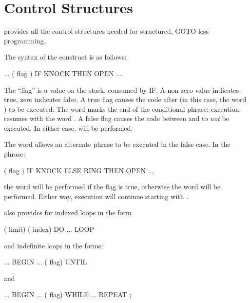 \section{Control Structures}
\Forth{} provides all the control structures%
needed for structured, GOTO-less programming.

The syntax of the  construct is as follows:
\begin{Code}
... ( flag ) IF  KNOCK  THEN  OPEN ...
\end{Code}
The ``flag'' is a value on the stack, consumed by IF. A
non-zero value indicates true, zero indicates false.  A true flag causes
the code after  (in this case, the word ) to be
executed.  The word  marks the end of the conditional phrase;
execution resumes with the word .  A false flag causes the
code between  and  to {\em not} be executed.  In
either case,  will be performed.

The word  allows an alternate phrase to be
executed in the false case. In the phrase:
\begin{Code}
( flag ) IF KNOCK  ELSE  RING  THEN  OPEN ...
\end{Code}
the word  will be performed if the flag is true, otherwise
the word  will be performed.  Either way, execution will
continue starting with .

\Forth{} also provides for indexed loops in the form
\begin{Code}
( limit) ( index) DO ... LOOP
\end{Code}
and indefinite loops in the forms:
\begin{Code}
... BEGIN  ...  ( flag) UNTIL
\end{Code}
and
\begin{Code}
... BEGIN  ...  ( flag) WHILE ... REPEAT ;
\end{Code}

